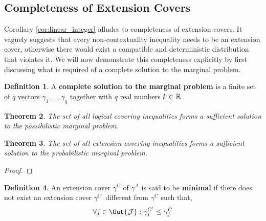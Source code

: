 \documentclass[aps, 10pt, english, twoside, pra, nofootinbib, longbibliography]{revtex4-1}
\theoremstyle{plain}
\newtheorem{theorem}{Theorem}
\theoremstyle{definition}
\newtheorem{definition}[theorem]{Definition}
\theoremstyle{remark}
\newcommand{\ext}{\mathrel{\Yleft}}
\newcommand{\mscenario}{\mathcal{M}}
\newcommand{\jointvar}{\mathcal{J}}
\newcommand{\mset}[1]{\gamma^{#1}}
\newcommand{\extmset}[1]{\Gamma^{#1}}
\newcommand{\supp}[1]{\si\br{#1}}
\newcommand{\isext}[2]{\delta_{#1 \ext #2}}
\newcommand{\term}[1]{\textcolor{Mahogany}{\textbf{#1}}}
\begin{document}



    \subsection{Completeness of Extension Covers}
    Corollary \ref{cor:linear_integer} alludes to completeness of extension covers. It vaguely suggests that every non-contextuality inequality needs to be an extension cover, otherwise there would exist a compatible and deterministic distribution that violates it. We will now demonstrate this completeness explicitly by first discussing what is required of a complete solution to the marginal problem.
    \begin{definition}
        A \term{complete solution to the marginal problem} is a finite set of $q$ vectors $\gamma_1, \ldots, \gamma_q$ together with $q$ real numbers $k \in {\mathbb{R}}$
    \end{definition}
    \begin{theorem}
        \label{thm:complete_solution_log_cover}
        The set of all logical covering inequalities forms a sufficient solution to the possibilistic marginal problem.
    \end{theorem}
    \begin{theorem}
        \label{thm:complete_solution_ext_cover}
        The set of all extension covering inequalities forms a sufficient solution to the probabilistic marginal problem.
    \end{theorem}
    \begin{proof}
    \end{proof}
    \begin{definition}
        An extension cover $\mset{C}$ of $\mset{A}$ is said to be \term{minimal} if there does not exist an extension cover $\mset{C'}$ different from $\mset{C}$ such that,
        \[ \forall j \in \Out{\jointvar} : \mset{C'}_j \leq \mset{C}_j \]
    \end{definition}
\end{document}
